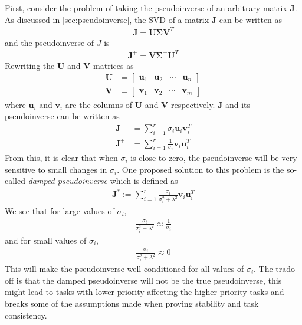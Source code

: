 First, consider the problem of taking the pseudoinverse of an arbitrary matrix $\bm{J}$.
As discussed in \autoref{sec:pseudoinverse}, the SVD of a matrix $\bm{J}$ can be
written as
\begin{align}
    \bm{J} = \bm{U} \bm{\Sigma} \bm{V}^T
\end{align}
and the pseudoinverse of $J$ is
\begin{align}
    \bm{J}^+ = \bm{V} \bm{\Sigma}^+ \bm{U}^T
\end{align}
Rewriting the $\bm{U}$ and $\bm{V}$ matrices as
\begin{subequations}
\begin{align}
    \bm{U} &= \begin{bmatrix} \bm{u}_1 & \bm{u}_2 & \cdots & \bm{u}_n \end{bmatrix} \\
    \bm{V} &= \begin{bmatrix} \bm{v}_1 & \bm{v}_2 & \cdots & \bm{v}_m \end{bmatrix}
\end{align}
\end{subequations}
where $\bm{u}_i$ and $\bm{v}_i$ are the columns of $\bm{U}$ and $\bm{V}$ respectively.
$\bm{J}$ and its pseudoinverse can be written as
\begin{subequations}
\begin{align}
    \bm{J} &= \sum_{i=1}^r \sigma_i \bm{u}_i \bm{v}_i^T \\
    \bm{J}^+ &= \sum_{i=1}^r \frac{1}{\sigma_i} \bm{v}_i \bm{u}_i^T
\end{align}
\end{subequations}
From this, it is clear that when $\sigma_i$ is close to zero, the pseudoinverse
will be very sensitive to small changes in $\sigma_i$. One proposed solution to
this problem is the so-called \emph{damped pseudoinverse} which is defined as
\begin{align}
    \bm{J}^* := \sum_{i=1}^r \frac{\sigma_i}{\sigma_i^2 + \lambda^2} \bm{v}_i \bm{u}_i^T
\end{align}
We see that for large values of $\sigma_i$,
\begin{align}
    \frac{\sigma_i}{\sigma_i^2 + \lambda^2} \approx \frac{1}{\sigma_i}
\end{align}
and for small values of $\sigma_i$,
\begin{align}
    \frac{\sigma_i}{\sigma_i^2 + \lambda^2} \approx 0
\end{align}
This will make the pseudoinverse well-conditioned for all values of $\sigma_i$.
The trado-off is that the damped pseudoinverse will not be the true pseudoinverse,
this might lead to tasks with lower priority affecting the higher priority tasks and
breaks some of the assumptions made when proving stability and task consistency.

